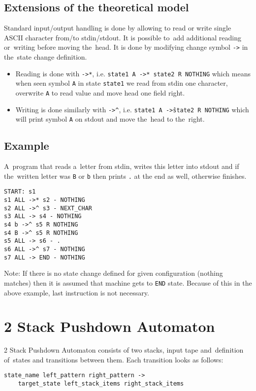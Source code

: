 \documentclass[english,shortabstract,mgr]{iithesis}
\begin{document}
\subsection {Extensions of the theoretical model}

Standard input/output handling is done by allowing to read or write single
ASCII character from/to stdin/stdout. It is possible to~add additional
reading or~writing before moving the~head. It is done by modifying change
symbol \texttt{->} in the~state change definition.
\begin{itemize}
  \item Reading is done with \texttt{->*}, i.e. \texttt{state1 A ->* state2 R NOTHING}
        which means when seen symbol \texttt{A} in state \texttt{state1} we read
        from stdin one character, overwrite \texttt{A} to read value and move
        head one field right.
  \item Writing is done similarly with \texttt{->\^},
        i.e. \texttt{state1 A ->\^ state2 R NOTHING} which will print symbol
        \texttt{A} on stdout and move the~head to the~right.
\end{itemize}

\subsection{Example}

A~program that reads a~letter from stdin, writes this letter into
stdout and if the~written letter was \texttt{B} or \texttt{b} then prints
\texttt{.} at the end as well, otherwise finishes.

\begin{verbatim}
START: s1
s1 ALL ->* s2 - NOTHING
s2 ALL ->^ s3 - NEXT_CHAR
s3 ALL -> s4 - NOTHING
s4 b ->^ s5 R NOTHING
s4 B ->^ s5 R NOTHING
s5 ALL -> s6 - .
s6 ALL ->^ s7 - NOTHING
s7 ALL -> END - NOTHING
\end{verbatim}

Note: If there is no state change defined for given configuration
(nothing matches) then it is assumed that machine gets to \texttt{END} state.
Because of this in the above example, last instruction is not necessary.

\section {2 Stack Pushdown Automaton}

2 Stack Pushdown Automaton consists of two stacks, input tape and~definition
of~states and transitions between them. Each transition looks as follows:
\begin{verbatim}
state_name left_pattern right_pattern ->
    target_state left_stack_items right_stack_items
\end{verbatim}
\end{document}
